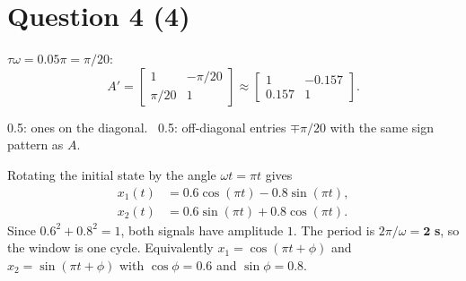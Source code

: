 \documentclass[11pt,letterpaper]{article}
\newcommand{\ans}[1]{\par\vspace{4pt}{\bfseries #1}\quad}
\begin{document}
\section*{Question 4 \hfill (4)}

\ans{(a) [1]}
$\tau\omega = 0.05\pi = \pi/20$:
\[
A' = \begin{bmatrix} 1 & -\pi/20 \\ \pi/20 & 1 \end{bmatrix}
\approx \begin{bmatrix} 1 & -0.157 \\ 0.157 & 1 \end{bmatrix}.
\]
\begin{marking}
0.5: ones on the diagonal. \ 0.5: off-diagonal entries $\mp\pi/20$ with the same sign pattern as $A$.
\end{marking}

\ans{(b) [3]}
Rotating the initial state by the angle $\omega t = \pi t$ gives
\[
\begin{aligned}
x_1(t) &= 0.6\cos(\pi t) - 0.8\sin(\pi t),\\
x_2(t) &= 0.6\sin(\pi t) + 0.8\cos(\pi t).
\end{aligned}
\]
Since $0.6^2 + 0.8^2 = 1$, both signals have amplitude $1$. The period is $2\pi/\omega = \mathbf{2}$ \textbf{s}, so the window is one cycle. Equivalently $x_1 = \cos(\pi t + \phi)$ and $x_2 = \sin(\pi t + \phi)$ with $\cos\phi = 0.6$ and $\sin\phi = 0.8$.
\end{document}
